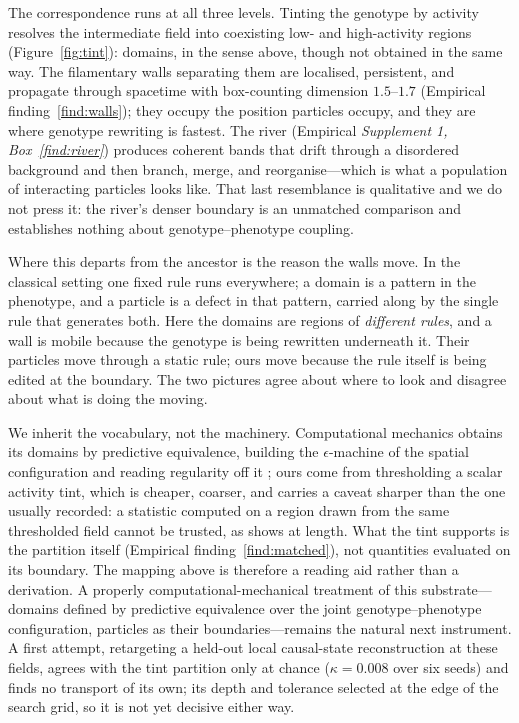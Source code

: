\documentclass[man,12pt,floatsintext,donotrepeattitle]{apa7}
\newcommand{\secref}[1]{\emph{\nameref{#1}}}
\begin{document}
The correspondence runs at all three levels. Tinting the genotype by activity
resolves the intermediate field into coexisting low- and high-activity regions
(Figure~\ref{fig:tint}): domains, in the sense above, though not obtained in
the same way. The filamentary walls separating them are localised, persistent,
and propagate through spacetime with box-counting dimension $1.5$--$1.7$
(Empirical finding~\ref{find:walls}); they occupy the position particles
occupy, and they are where genotype rewriting is fastest. The river (Empirical
\emph{Supplement 1, Box~\ref{find:river}}) produces coherent bands that drift through a
disordered background and then branch, merge, and reorganise---which is what a
population of interacting particles looks like. That last resemblance is
qualitative and we do not press it: the river's denser boundary is an unmatched
comparison and establishes nothing about genotype--phenotype coupling.

Where this departs from the ancestor is the reason the walls move. In the
classical setting one fixed rule runs everywhere; a domain is a pattern in the
phenotype, and a particle is a defect in that pattern, carried along by the
single rule that generates both. Here the domains are regions of
\emph{different rules}, and a wall is mobile because the genotype is being
rewritten underneath it. Their particles move through a static rule; ours move
because the rule itself is being edited at the boundary. The two pictures agree
about where to look and disagree about what is doing the moving.

We inherit the vocabulary, not the machinery. Computational mechanics obtains
its domains by predictive equivalence, building the $\epsilon$-machine of the
spatial configuration and reading regularity off it
\parencite{crutchfield1989inferring,shalizi2001computational}; ours come from
thresholding a scalar activity tint, which is cheaper, coarser, and carries a
caveat sharper than the one usually recorded: a statistic computed on a region
drawn from the same thresholded field cannot be trusted, as
\secref{sec:eoc-compute} shows at length. What the tint supports is the
partition itself (Empirical finding~\ref{find:matched}), not quantities
evaluated on its boundary. The mapping above is therefore a reading
aid rather than a derivation. A properly computational-mechanical treatment of
this substrate---domains defined by predictive equivalence over the joint
genotype--phenotype configuration, particles as their boundaries---remains the
natural next instrument. A first attempt, retargeting a held-out local
causal-state reconstruction at these fields, agrees with the tint partition only
at chance ($\kappa = 0.008$ over six seeds) and finds no transport of its own;
its depth and tolerance selected at the edge of the search grid, so it is not
yet decisive either way.


\printbibliography
\end{document}
